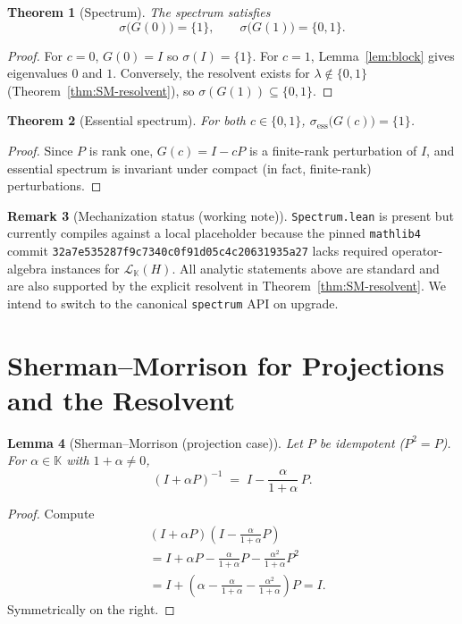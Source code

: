 \documentclass[11pt]{article}
\newtheorem{theorem}{Theorem}[section]
\newtheorem{lemma}[theorem]{Lemma}
\theoremstyle{definition}
\newtheorem{remark}[theorem]{Remark}
\newcommand{\K}{\mathbb{K}}
\newcommand{\CL}[2]{\mathcal{L}_{#1}(#2)} %
\begin{document}
\begin{theorem}[Spectrum]\label{thm:spectrum}
The spectrum satisfies
\[
\sigma\big(G(0)\big)=\{1\},\qquad \sigma\big(G(1)\big)=\{0,1\}.
\]
\end{theorem}

\begin{proof}
For $c=0$, $G(0)=I$ so $\sigma(I)=\{1\}$. For $c=1$, Lemma~\ref{lem:block} gives eigenvalues $0$ and $1$. Conversely, the resolvent exists for $\lambda\notin\{0,1\}$ (Theorem~\ref{thm:SM-resolvent}), so $\sigma(G(1))\subseteq\{0,1\}$.
\end{proof}

\begin{theorem}[Essential spectrum]\label{thm:ess}
For both $c\in\{0,1\}$, $\sigma_{\mathrm{ess}}\big(G(c)\big)=\{1\}$.
\end{theorem}

\begin{proof}
Since $P$ is rank one, $G(c)=I-cP$ is a finite-rank perturbation of $I$, and essential spectrum is invariant under compact (in fact, finite-rank) perturbations.
\end{proof}

\begin{remark}[Mechanization status (working note)]
\texttt{Spectrum.lean} is present but currently compiles against a local placeholder because the pinned \texttt{mathlib4} commit \texttt{32a7e535287f9c7340c0f91d05c4c20631935a27} lacks required operator-algebra instances for $\CL{\K}{H}$. All analytic statements above are standard and are also supported by the explicit resolvent in Theorem~\ref{thm:SM-resolvent}. We intend to switch to the canonical \texttt{spectrum} API on upgrade.
\end{remark}

\section{Sherman--Morrison for Projections and the Resolvent}\label{sec:SM}

\begin{lemma}[Sherman--Morrison (projection case)]\label{lem:SM}
Let $P$ be idempotent ($P^2=P$). For $\alpha\in\K$ with $1+\alpha\neq 0$,
\[
(I+\alpha P)^{-1} \;=\; I - \frac{\alpha}{1+\alpha}\,P.
\]
\end{lemma}

\begin{proof}
Compute
\begin{align}
&(I+\alpha P)\left(I - \frac{\alpha}{1+\alpha}P\right) \\
&= I + \alpha P - \frac{\alpha}{1+\alpha}P - \frac{\alpha^2}{1+\alpha}P^2 \\
&= I + \left(\alpha - \frac{\alpha}{1+\alpha} - \frac{\alpha^2}{1+\alpha}\right)P = I.
\end{align}
Symmetrically on the right.
\end{proof}
\end{document}
